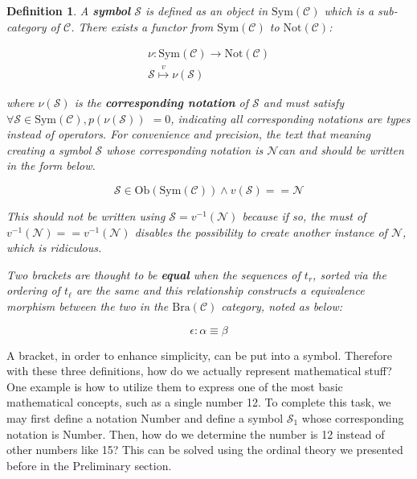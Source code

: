 \documentclass{aims}
\newtheorem{definition}{Definition}	%
\numberwithin{theorem}{section}	%
\numberwithin{axiom}{section}	%
\numberwithin{definition}{section}	%
\begin{document}
\begin{definition}
	A \textbf{ symbol} \(\mathcal{S}\) is defined as an object in \(\text{Sym}(\mathcal{C})\) which is a sub-category of \(\mathcal{C}\). There exists a functor from \(\text{Sym}(\mathcal{C})\) to \(\text{Not}(\mathcal{C})\):
	
	\begin{equation}
		\begin{gathered}
			\nu :\text{Sym}(\mathcal{C})\to \text{Not}(\mathcal{C})\\
			\mathcal{S}\overset{\mathit{v}}{\mapsto }\nu (\mathcal{S})
		\end{gathered}
	\end{equation}
	
	\noindent where \(\nu (\mathcal{S})\) is the \textbf{ corresponding notation} of \(\mathcal{S}\) and must satisfy \(\forall \mathcal{S}\in \text{Sym}(\mathcal{C}),\mathit{p}(\nu (\mathcal{S}))\) \(= 0\), indicating all corresponding notations are types instead of operators. For convenience and precision, the text that meaning creating a symbol \(\mathcal{S}\) whose corresponding notation is \(\mathcal{N}\)can and should be written in the form below.
	
	\begin{equation}
		\mathcal{S}\in \text{Ob}(\text{Sym}(\mathcal{C}))\land \mathit{v}(\mathcal{S})==\mathcal{N}
	\end{equation}
	
	This should not be written using \(\mathcal{S}=\mathit{v}^{-1}(\mathcal{N})\) because if so, the must of \(\mathit{v}^{-1}(\mathcal{N})==\mathit{v}^{-1}(\mathcal{N})\) disables the possibility to create another instance of \(\mathcal{N}\), which is ridiculous. 
	
	Two brackets are thought to be \textbf{ equal} when the sequences of \(t_{\mathit{r}}\), sorted via the ordering of \(t_{\ell }\) are the same and this relationship constructs a equivalence morphism between the two in the \(\text{Bra}(\mathcal{C})\) category, noted as below:
	
	\begin{equation}
		\epsilon :\alpha \equiv \beta
	\end{equation}
\end{definition}

A bracket, in order to enhance simplicity, can be put into a symbol. Therefore with these three definitions, how do we actually represent mathematical stuff? One example is how to utilize them to express one of the most basic mathematical concepts, such as a single number 12. To complete this task, we may first define a notation Number and define a symbol \(\mathcal{S}_1\) whose corresponding notation is Number. Then, how do we determine the number is 12 instead of other numbers like 15? This can be solved using the ordinal theory we presented before in the Preliminary section.
\end{document}
